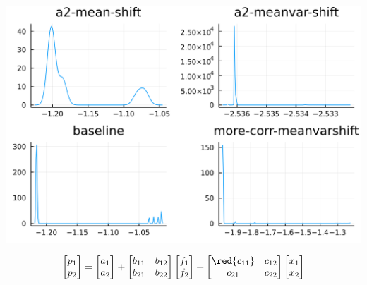 \documentclass[
  ignorenonframetext,
]{beamer}
\begin{document}
\begin{frame}{}
\protect\hypertarget{section-9}{}
\begin{center}\includegraphics[width=0.95\paperheight]{complexity_files/figure-beamer/unnamed-chunk-30-1} \end{center}

\[
\begin{bmatrix}
 p_1 \\ p_2
\end{bmatrix} =
\begin{bmatrix}
 a_1 \\ {a_2}
\end{bmatrix}
 + 
 \begin{bmatrix}
 {b_{11}} & b_{12} \\
 {b_{21}} & {b_{22}}
\end{bmatrix}
\begin{bmatrix}
 f_1 \\ f_2
\end{bmatrix}
+
 \begin{bmatrix}
 \red{c_{11}} & c_{12} \\
 c_{21} & c_{22}
\end{bmatrix}
\begin{bmatrix}
 x_1 \\ x_2
\end{bmatrix}
\]
\end{frame}
\end{document}
